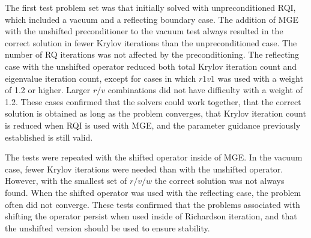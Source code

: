 \documentclass[preprint,12pt]{elsarticle}
\begin{document}
The first test problem set was that initially solved with unpreconditioned RQI, which included a vacuum and a reflecting boundary case. The addition of MGE with the unshifted preconditioner to the vacuum test always resulted in the correct solution in fewer Krylov iterations than the unpreconditioned case. The number of RQ iterations was not affected by the preconditioning. The reflecting case with the unshifted operator reduced both total Krylov iteration count and eigenvalue iteration count, except for cases in which $r1v1$ was used with a weight of 1.2 or higher. Larger $r/v$ combinations did not have difficulty with a weight of 1.2. These cases confirmed that the solvers could work together, that the correct solution is obtained as long as the problem converges, that Krylov iteration count is reduced when RQI is used with MGE, and the parameter guidance previously established is still valid. 

The tests were repeated with the shifted operator inside of MGE. In the vacuum case, fewer Krylov iterations were needed than with the unshifted operator. However, with the smallest set of $r/v/w$ the correct solution was not always found. When the shifted operator was used with the reflecting case, the problem often did not converge. These tests confirmed that the problems associated with shifting the operator persist when used inside of Richardson iteration, and that the unshifted version should be used to ensure stability. 
\end{document}

